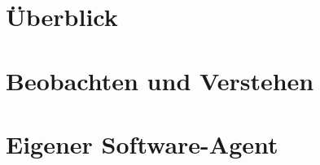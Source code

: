 \documentclass[twocolumn]{article}
\begin{document}
  \twocolumn[
    
    
  ]
  
  
  
  
  
  \section{Überblick} %
  \label{sec:uberblick}
  
  
  \section{Beobachten und Verstehen} %
  \label{sec:beobachten_und_verstehen}
  
  
  
  
  \section{Eigener Software-Agent} %
  \label{sec:eigener_software_agent}
  
  
  
\end{document}
